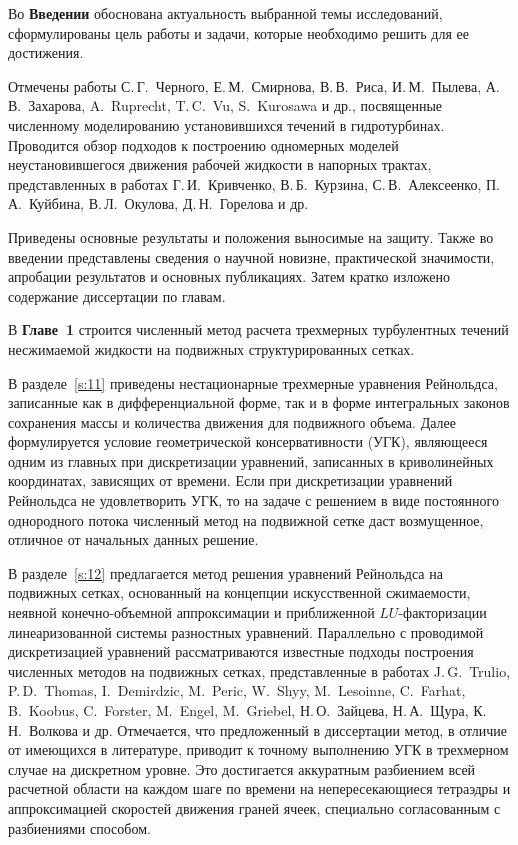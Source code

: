 Во \textbf{Введении} обоснована актуальность выбранной темы исследований, сформулированы
цель работы и задачи, которые необходимо решить для ее достижения. 

Отмечены работы С.\,Г.~Черного, 
Е.\,М.~Смирнова, В.\,В.~Риса, И.\,М.~Пылева, А.\,В.~Захарова, A.~Ruprecht, T.\,C.~Vu, S.~Kurosawa и др., 
посвященные численному  моделированию установившихся течений в гидротурбинах.  
Проводится обзор подходов к построению одномерных моделей неустановившегося движения рабочей жидкости в 
напорных трактах, представленных в работах Г.\,И.~Кривченко, В.\,Б.~Курзина, С.\,В.~Алексеенко, 
П.\,А.~Куйбина, В.\,Л.~Окулова, Д.\,Н.~Горелова и др.

Приведены основные результаты и положения выносимые на защиту. 
Также во введении представлены сведения о научной новизне, практической значимости, 
апробации результатов и основных публикациях. Затем кратко изложено содержание диссертации по главам.

В \textbf{Главе~1} строится численный метод расчета трехмерных турбулентных течений несжимаемой 
жидкости на подвижных структурированных сетках.

В разделе~\ref{s:11} приведены нестационарные трехмерные уравнения Рейнольдса, записанные как в 
дифференциальной форме, так и в форме интегральных законов сохранения массы и количества движения для 
подвижного объема. Далее формулируется условие геометрической консервативности (УГК), являющееся одним из 
главных при дискретизации уравнений, записанных в криволинейных координатах, зависящих от времени. Если 
при дискретизации уравнений Рейнольдса не удовлетворить УГК, 
то на задаче с решением в виде постоянного однородного потока численный метод на подвижной сетке даст 
возмущенное, отличное от начальных данных решение.

В разделе~\ref{s:12} предлагается метод решения уравнений Рейнольдса на подвижных сетках, основанный на 
концепции искусственной сжимаемости, неявной конечно-объемной аппроксимации и приближенной $LU$-факторизации
линеаризованной системы разностных уравнений.  
Параллельно с проводимой дискретизацией уравнений рассматриваются известные подходы 
построения численных методов на подвижных сетках,  представленные в работах J.\,G.~Trulio, 
P.\,D.~Thomas, I.~Demirdzic, M.~Peric, W.~Shyy, M.~Lesoinne, C.~Farhat, B.~Koobus, C.~Forster, 
M.~Engel, M.~Griebel, Н.\,О.~Зайцева, Н.\,А.~Щура, К.\,Н.~Волкова и др.
Отмечается, что предложенный в диссертации метод, 
в отличие от имеющихся в литературе, приводит к точному выполнению УГК 
в трехмерном случае на дискретном уровне. Это достигается аккуратным разбиением всей расчетной области на 
каждом шаге по времени на непересекающиеся тетраэдры и аппроксимацией скоростей движения граней 
ячеек, специально согласованным с разбиениями способом.

